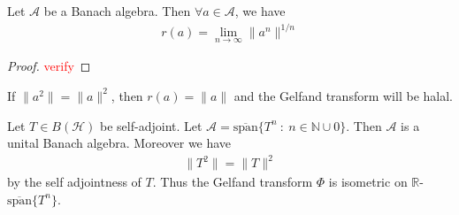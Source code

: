 \begin{theorem}
  \label{thm:beurling}
  Let $\mathcal{A}$ be a Banach algebra. Then $\forall a \in
  \mathcal{A}$, we have
  \begin{align*}
    r(a) = \lim_{n \to \infty} \|a^n\|^{1/n}
  \end{align*}
\end{theorem}
\begin{proof}
  \textcolor{red}{verify}
\end{proof}

\begin{corollary}
  If $\|a^2\| = \|a\|^2$, then $r(a) = \|a\|$ and the Gelfand
  transform will be halal.
\end{corollary}

\begin{example}
  Let $T \in B(\mathcal{H})$ be self-adjoint. Let $\mathcal{A} =
  \overline{\textrm{span}}\{ T^n  \ : \  n \in \mathbb{N} \cup {0}
  \}$. Then $\mathcal{A}$ is a unital Banach algebra. Moreover we have
  \begin{align*}
    \|T^2\| = \|T\|^{2}
  \end{align*}
  by the self adjointness of $T$. Thus the Gelfand transform $\Phi$
  is isometric on $\mathbb{R}$-$\overline{\textrm{span}}\{T^n\}$.
\end{example}
